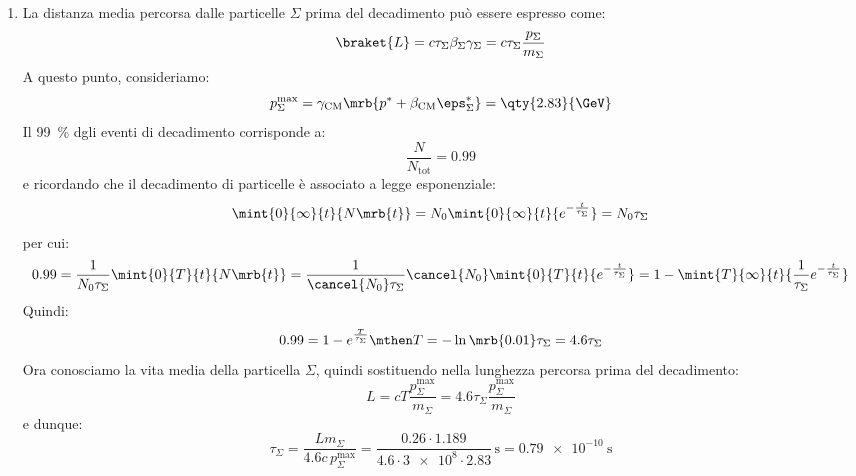 \begin{example}[]
\begin{enumerate}
		\item La distanza media percorsa dalle particelle $\Sigma$ prima del
		      decadimento può essere espresso come:
		      \begin{equation}
			      \braket{L}
			      = c \tau _{\Sigma} \beta _{\Sigma} \gamma _{\Sigma}
			      = c \tau _{\Sigma} \frac{p _{\Sigma}}{m _{\Sigma}}
		      \end{equation}
		      A questo punto, consideriamo:
		      \begin{equation}
			      p _{\Sigma}^\text{max}
			      = \gamma _\text{CM} \mrb{p ^{\ast}
				      + \beta _\text{CM} \eps _{\Sigma}^{\ast}}
			      = \qty{2.83}{\GeV}
		      \end{equation}
		      Il \qty{99}{\%} dgli eventi di decadimento corrisponde a:
		      \begin{equation}
			      \frac{N}{N _\text{tot}} = 0.99
		      \end{equation}
		      e ricordando che il decadimento di particelle è associato a legge
		      esponenziale:
		      \begin{equation}
			      \mint{0}{\infty}{t}{N \mrb{t}}
			      = N _{0} \mint{0}{\infty}{t}{e^{- \frac{t}{\tau _{\Sigma}}}}
			      = N _{0} \tau _{\Sigma}
		      \end{equation}
		      per cui:
		      \begin{equation}
			      0.99
			      = \frac{1}{N _{0} \tau _{\Sigma}} \mint{0}{T}{t}{N \mrb{t}}
			      = \frac{1}{\cancel{N_0} \tau _{\Sigma}}
			      \cancel{N_0} \mint{0}{T}{t}{e^{- \frac{t}{\tau _{\Sigma}}}}
			      = 1 - \mint{T}{\infty}{t}{\frac{1}{\tau _{\Sigma}}
				      e^{- \frac{t}{\tau _{\Sigma}}}}
		      \end{equation}
		      Quindi:
		      \begin{equation}
			      0.99 = 1 - e^{\frac{T}{\tau _{\Sigma}}}
			      \mthen
			      T = - \ln \mrb{0.01} \tau _{\Sigma} = 4.6 \tau _{\Sigma}
		      \end{equation}
		      Ora conosciamo la vita media della particella $\Sigma$, quindi
		      sostituendo nella lunghezza percorsa prima del decadimento:
		      \begin{equation}
			      L
			      = c T \frac{p _{\Sigma}^\text{max}}{m _{\Sigma}}
			      = 4.6 \tau _{\Sigma} \frac{p _{\Sigma}^\text{max}}{m _{\Sigma}}
		      \end{equation}
		      e dunque:
		      \begin{equation}
			      \tau _{\Sigma}
			      = \frac{L m_{\Sigma}}{4.6 c\, p _{\Sigma}^\text{max}}
			      = \frac{0.26 \cdot 1.189}{4.6 \cdot \qty{3e8} \cdot 2.83}\, \si{\s}
			      = \qty{0.79e-10}{\s}
		      \end{equation}
	\end{enumerate}
\end{example}
